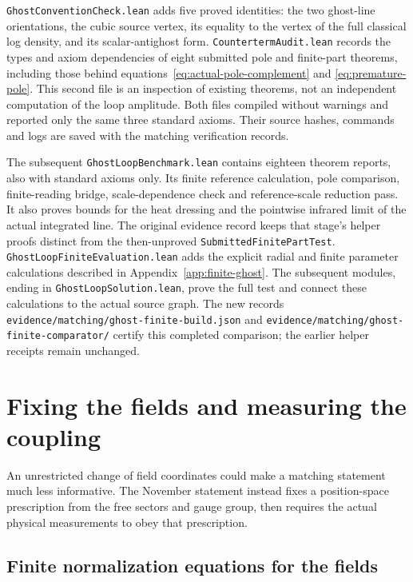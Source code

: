 \documentclass[11pt]{article}
\newcommand{\code}[1]{{\small\nolinkurl{#1}}}
\begin{document}
\code{GhostConventionCheck.lean} adds five proved identities: the two
ghost-line orientations, the cubic source vertex, its equality to the
vertex of the full classical log density, and its scalar-antighost
form. \code{CountertermAudit.lean} records the types and axiom
dependencies of eight submitted pole and finite-part theorems, including
those behind equations~\eqref{eq:actual-pole-complement} and
\eqref{eq:premature-pole}. This second file is an inspection of existing
theorems, not an independent computation of the loop amplitude.
Both files compiled without warnings and reported only the same three
standard axioms. Their source hashes, commands and logs are saved with
the matching verification records.

The subsequent \code{GhostLoopBenchmark.lean} contains eighteen theorem
reports, also with standard axioms only. Its finite reference calculation,
pole comparison, finite-reading bridge, scale-dependence check and
reference-scale reduction pass. It also proves bounds for the heat dressing
and the pointwise infrared limit of the actual integrated line.
The original evidence record keeps that stage's helper proofs distinct
from the then-unproved \code{SubmittedFinitePartTest}.
\code{GhostLoopFiniteEvaluation.lean} adds the explicit radial and
finite parameter calculations described in Appendix~\ref{app:finite-ghost}.
The subsequent modules, ending in \code{GhostLoopSolution.lean}, prove
the full test and connect these calculations to the actual source
graph. The new records \code{evidence/matching/ghost-finite-build.json}
and \code{evidence/matching/ghost-finite-comparator/} certify this
completed comparison; the earlier helper receipts remain unchanged.

\section{Fixing the fields and measuring the coupling}
\label{sec:normalization}

An unrestricted change of field coordinates could make a matching
statement much less informative. The November statement instead fixes
a position-space prescription from the free sectors and gauge group,
then requires the actual physical measurements to obey that prescription.

\subsection{Finite normalization equations for the fields}
\end{document}
